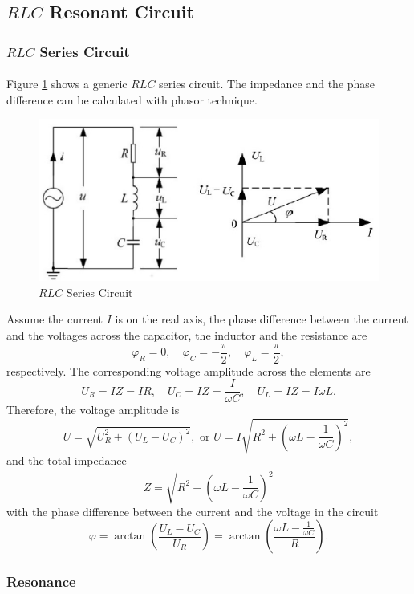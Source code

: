 \documentclass{my_template}
\renewcommand{\phi}{\varphi}
\begin{document}
    \subsection{$RLC$ Resonant Circuit}
    \subsubsection{$RLC$ Series Circuit}
    \paragraph{} Figure \ref{fig:RLC} shows a generic $RLC$ series circuit. The impedance and the phase difference can be calculated with phasor technique. 
    \begin{figure}[H]
        \centering
        \includegraphics[width=\textwidth]{fig/RLC_Resonant.png}
        \caption{$RLC$ Series Circuit}
        \label{fig:RLC}
    \end{figure}
    Assume the current $I$ is on the real axis, the phase difference between the current and the voltages across the capacitor, the inductor and the resistance are $$\varphi_R=0,\quad \phi_C=-\frac{\pi}{2},\quad \varphi_L=\frac{\pi}{2},$$ respectively. The corresponding voltage amplitude across the elements are $$U_R=IZ=IR,\quad U_C=IZ=\frac{I}{\omega C},\quad U_L=IZ=I\omega L.$$ Therefore, the voltage amplitude is \[U=\sqrt{U_R^2+(U_L-U_C)^2},\text{ or }U=I\sqrt{R^2+\left(\omega L-\frac{1}{\omega C}\right)^2},\] and the total impedance \[Z=\sqrt{R^2+\left(\omega L-\frac{1}{\omega C}\right)^2}\] with the phase difference between the current and the voltage in the circuit 
    \begin{equation}
        \phi=\arctan\left(\frac{U_L-U_C}{U_R}\right)=\arctan\left(\frac{\omega L-\frac{1}{\omega C}}{R}\right).\label{eqn:phasedifference}
    \end{equation}
    \subsubsection{Resonance}
\end{document}
